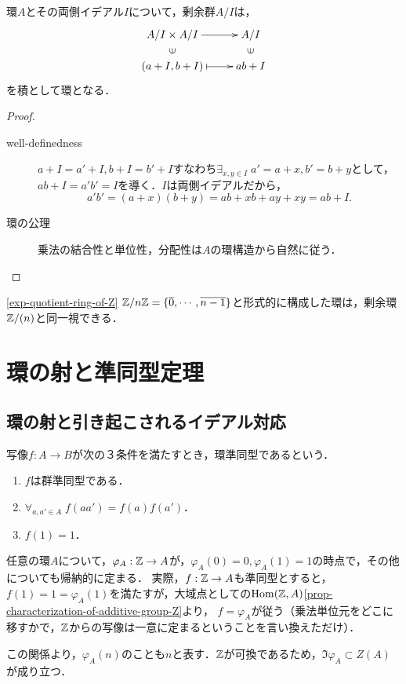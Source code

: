 \documentclass[uplatex,dvipdfmx]{jsreport}
\begin{document}
\begin{lemma}
    環$A$とその両側イデアル$I$について，剰余群$A/I$は，
    \[\xymatrix@R-2pc{
        A/I\times A/I\ar[r]&A/I\\
        \rotatebox[origin=c]{90}{$\in$}&\rotatebox[origin=c]{90}{$\in$}\\
        (a+I,b+I)\ar@{|->}[r]&ab+I
    }\]
    を積として環となる．
\end{lemma}
\begin{proof}\mbox{}
    \begin{description}
        \item[well-definedness] $a+I=a'+I,b+I=b'+I$すなわち$\exists_{x,y\in I}\;a'=a+x,b'=b+y$として，$ab+I=a'b'=I$を導く．$I$は両側イデアルだから，\[
            a'b'=(a+x)(b+y)=ab+xb+ay+xy=ab+I.\]
        \item[環の公理] 乗法の結合性と単位性，分配性は$A$の環構造から自然に従う．
    \end{description}
\end{proof}

\begin{example}\ref{exp-quotient-ring-of-Z}
    $\mathbb{Z}/n\mathbb{Z}=\{\overline{0},\cdots,\overline{n-1}\}$と形式的に構成した環は，剰余環$\mathbb{Z}/(n)$と同一視できる．
\end{example}

\section{環の射と準同型定理}

\subsection{環の射と引き起こされるイデアル対応}

\begin{definition}
    写像$f:A\to B$が次の３条件を満たすとき，環準同型であるという．
    \begin{enumerate}
        \item $f$は群準同型である．
        \item $\forall_{a,a'\in A}\;f(aa')=f(a)f(a')$．
        \item $f(1)=1$．
    \end{enumerate}
\end{definition}

\begin{example}[整数環は始対象である]\label{exp-Z-as-initial-object}
    任意の環$A$について，$\varphi_A:\mathbb{Z}\to A$が，$\varphi_A(0)=0,\varphi_A(1)=1$の時点で，その他についても帰納的に定まる．
    実際，$f:\mathbb{Z}\to A$も準同型とすると，$f(1)=1=\varphi_A(1)$を満たすが，大域点としての$\mathrm{Hom}(\mathbb{Z},A)$\ref{prop-characterization-of-additive-group-Z}より，
    $f=\varphi_A$が従う（乗法単位元をどこに移すかで，$\mathbb{Z}$からの写像は一意に定まるということを言い換えただけ）．

    この関係より，$\varphi_A(n)$のことも$n$と表す．$\mathbb{Z}$が可換であるため，$\Im\varphi_A\subset Z(A)$が成り立つ．
\end{example}
\end{document}
